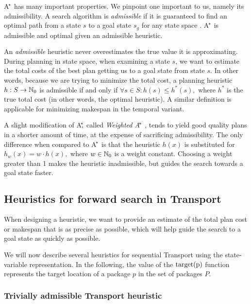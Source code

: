 A$^{\kern-.15em*}$ has many important properties. We pinpoint one important to us, namely its admissibility.
A search algorithm is \textit{admissible}
if it is guaranteed to find an optimal path from a state $s$
to a goal state $s_g$ for any state space \citep{Hart1968}.
A$^{\kern-.15em*}$ is admissible and optimal given an admissible heuristic.

An \textit{admissible} heuristic never overestimates
the true value it is approximating. During planning in state space,
when examining a state $s$, we want to estimate the total costs of the best
plan getting us to a goal state from state $s$. In other words, because we are
trying to minimize the total cost,
a planning heuristic $h: S \to \mathbb{N}_0$ is admissible if and only if $\forall s \in S : h(s) \leq h^*(s),$
where $h^*$ is the true total cost (in other words, the optimal heuristic). A similar definition is applicable for minimizing makespan in the temporal variant.

A slight modification of A$^{\kern-.15em*}{\kern-.30em,}$ called \textit{Weighted A$^{\kern-.15em*}$} \citep{Pohl1970},
tends to yield good quality plans in a shorter amount of time,
at the expense of
sacrificing admissibility. The only difference
when compared to A$^{\kern-.15em*}$ is that the heuristic $h(x)$
is substituted for $h_w(x) = w \cdot h(x),$
where $w \in \mathbb{N}_0$ is a weight constant. Choosing a weight greater
than 1 makes the heuristic inadmissible,
but guides the search towards a goal state faster.


\subsection{Heuristics for forward search in Transport}\label{seq-heuristics}

When designing a heuristic, we want to provide an estimate
of the total plan cost or makespan
that is as precise as possible, which
will help guide the search to a goal state as quickly as
possible.

We will now describe several heuristics for sequential
Transport using the state-variable representation.
In the following, the value of the $\textrm{target(p)}$ function represents
the target location of a package $p$ in the set of packages $P$.

\subsubsection{Trivially admissible Transport heuristic}\label{sfa0}

